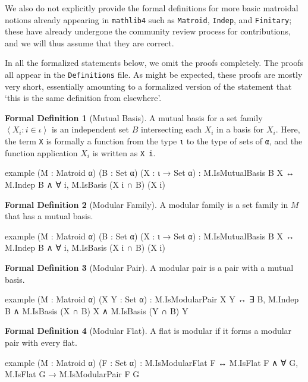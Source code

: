 \documentclass{amsart}
\theoremstyle{plain}
\theoremstyle{definition}
\newcommand{\ab}[1]{\left\langle#1\right\rangle}
\newcommand{\smalltt}[1]{{\small\texttt{#1}}}
\newtheorem*{fdef}{Formal Definition}
\begin{document}
We also do not explicitly provide the formal
definitions for more basic matroidal notions already appearing in \smalltt{mathlib4}
such as \smalltt{Matroid}, \smalltt{Indep}, and \smalltt{Finitary}; 
these have already undergone the community review process for 
contributions, and we will thus assume that they are correct.  

In all the formalized statements below, we omit the proofs completely. 
The proofs all appear in the \smalltt{Definitions} file.
As might be expected, these proofs are mostly very short, essentially amounting to 
a formalized version of the statement that `this is the same definition from elsewhere'.

\begin{fdef}[Mutual Basis]
  A mutual basis for a set family $\ab{X_i : i \in \iota}$ 
  is an independent set $B$ intersecting each $X_i$ in a basis for $X_i$. 
  Here, the term \smalltt{X} is formally a function from the type \smalltt{ι}
  to the type of sets of \smalltt{α}, 
  and the function application $X_i$ is written as \smalltt{X i}.
  \begin{leancode}
example (M : Matroid α) (B : Set α) (X : ι → Set α) :
  M.IsMutualBasis B X ↔ M.Indep B ∧ ∀ i, M.IsBasis (X i ∩ B) (X i)
  \end{leancode}
\end{fdef}

\begin{fdef}[Modular Family]
  A modular family is a set family in $M$ that has a mutual basis. 
  \begin{leancode}
example (M : Matroid α) (B : Set α) (X : ι → Set α) :
  M.IsMutualBasis B X ↔ M.Indep B ∧ ∀ i, M.IsBasis (X i ∩ B) (X i)
  \end{leancode}
\end{fdef}

\begin{fdef}[Modular Pair]
  A modular pair is a pair with a mutual basis. 
  \begin{leancode}
example (M : Matroid α) (X Y : Set α) :
  M.IsModularPair X Y ↔ 
  ∃ B, M.Indep B ∧ M.IsBasis (X ∩ B) X ∧ M.IsBasis (Y ∩ B) Y
  \end{leancode}
\end{fdef}

\begin{fdef}[Modular Flat]
  A flat is modular if it forms a modular pair with every flat. 
  \begin{leancode}
example (M : Matroid α) (F : Set α) :
  M.IsModularFlat F ↔
  M.IsFlat F ∧ ∀ G, M.IsFlat G → M.IsModularPair F G
  \end{leancode}
\end{fdef}
\end{document}
